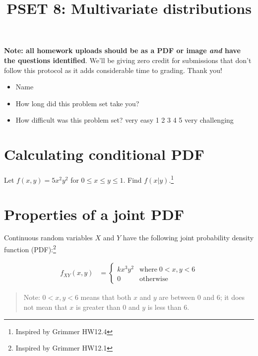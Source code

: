 \documentclass[
]{article}
\title{PSET 8: Multivariate distributions}
\author{}
\date{\vspace{-2.5em}}
\begin{document}
\maketitle

\textbf{Note: all homework uploads should be as a PDF or image
\emph{and} have the questions identified}. We'll be giving zero credit
for submissions that don't follow this protocol as it adds considerable
time to grading. Thank you!

\begin{itemize}
\item
  Name
\item
  How long did this problem set take you?
\item
  How difficult was this problem set? very easy 1 2 3 4 5 very
  challenging
\end{itemize}

\section{Calculating conditional PDF}\label{calculating-conditional-pdf}

Let \(f(x,y) = 5x^2y^2\) for \(0 \leq x \leq y \leq 1\). Find
\(f(x|y)\).\footnote{Inspired by Grimmer HW12.4}

\hfill\break
\hfill\break
\hfill\break
\hfill\break
\hfill\break
\hfill\break
\hfill\break
\hfill\break
\hfill\break

\section{Properties of a joint PDF}\label{properties-of-a-joint-pdf}

Continuous random variables \(X\) and \(Y\) have the following joint
probability density function (PDF):\footnote{Inspired by Grimmer HW12.1}

\[
\begin{aligned}
f_{XY} (x, y) &= \begin{cases}
k x^3 y^2 & \text{where} \; 0 < x, y < 6 \\
0 & \text{otherwise}
\end{cases}
\end{aligned}
\]

\begin{quote}
Note: \(0 < x,y <6\) means that both \(x\) and \(y\) are between 0 and
6; it does not mean that \(x\) is greater than 0 and \(y\) is less than
6.
\end{quote}
\end{document}
